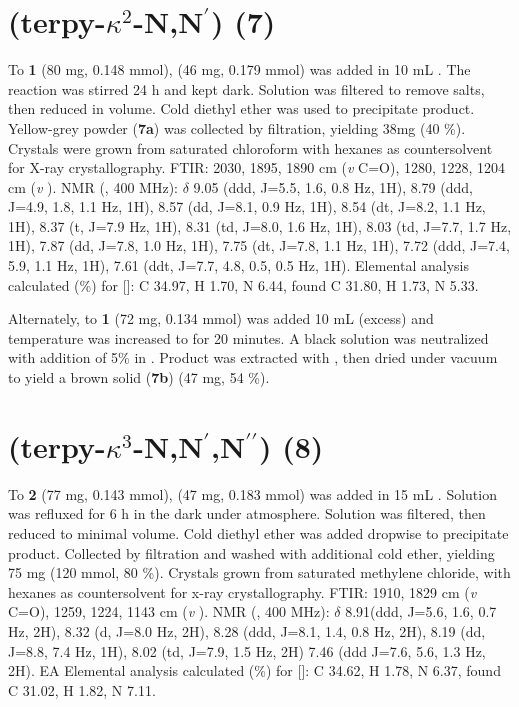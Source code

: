 \section{(terpy-$\kappa^2$-N,N$^\prime$) (7)} \label{sec.c7}
To \textbf{1} (80 mg, 0.148 mmol),  (46 mg, 0.179 mmol) was added in 10 mL . The reaction was stirred 24 h and kept dark. Solution was filtered to remove salts, then reduced in volume. Cold diethyl ether was used to precipitate product. Yellow-grey powder (\textbf{7a}) was collected by filtration, yielding 38mg (40 \%). Crystals were grown from saturated chloroform with hexanes as countersolvent for X-ray crystallography. FTIR: 2030, 1895, 1890 cm (\textit{v} C=O), 1280, 1228, 1204 cm (\textit{v} ).  NMR (, 400 MHz): $\delta$ 9.05 (ddd, J=5.5, 1.6, 0.8 Hz, 1H), 8.79 (ddd, J=4.9, 1.8, 1.1 Hz, 1H), 8.57 (dd, J=8.1, 0.9 Hz, 1H), 8.54 (dt, J=8.2, 1.1 Hz, 1H), 8.37 (t, J=7.9 Hz, 1H), 8.31 (td, J=8.0, 1.6 Hz, 1H), 8.03 (td, J=7.7, 1.7 Hz, 1H), 7.87 (dd, J=7.8, 1.0 Hz, 1H), 7.75 (dt, J=7.8, 1.1 Hz, 1H), 7.72 (ddd, J=7.4, 5.9, 1.1 Hz, 1H), 7.61 (ddt, J=7.7, 4.8, 0.5, 0.5 Hz, 1H).  Elemental analysis calculated (\%) for []: C 34.97, H 1.70, N 6.44, found C 31.80, H 1.73, N 5.33.

Alternately, to \textbf{1} (72 mg, 0.134 mmol) was added 10 mL  (excess) and temperature was increased to  for 20 minutes. A black solution was neutralized with addition of 5\%  in . Product was extracted with , then dried under vacuum to yield a brown solid (\textbf{7b}) (47 mg, 54 \%).

\section{(terpy-$\kappa^3$-N,N$^\prime$,N$^{\prime \prime}$) (8)} \label{sec.c8}
To \textbf{2} (77 mg,  0.143 mmol),  (47 mg,  0.183 mmol) was added in 15 mL . Solution was refluxed for 6 h in the dark under  atmosphere. Solution was filtered, then reduced to minimal volume. Cold diethyl ether was added dropwise to precipitate product. Collected by filtration and washed with additional cold ether, yielding 75 mg (120 mmol, 80 \%).  Crystals grown from saturated methylene chloride, with hexanes as countersolvent for x-ray crystallography. FTIR: 1910, 1829 cm (\textit{v} C=O), 1259, 1224, 1143 cm (\textit{v} ).  NMR (, 400 MHz): $\delta$ 8.91(ddd, J=5.6, 1.6, 0.7 Hz, 2H), 8.32 (d, J=8.0 Hz, 2H), 8.28 (ddd, J=8.1, 1.4, 0.8 Hz, 2H), 8.19 (dd, J=8.8, 7.4 Hz, 1H), 8.02 (td, J=7.9, 1.5 Hz, 2H) 7.46 (ddd J=7.6, 5.6, 1.3 Hz, 2H).  EA Elemental analysis calculated (\%) for []: C 34.62, H 1.78, N 6.37, found C 31.02, H 1.82, N 7.11.


